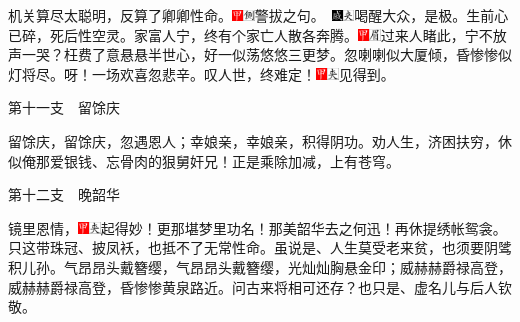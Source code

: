 机关算尽太聪明，反算了卿卿性命。{{\includegraphics[width=3mm]{../Images/00002}\includegraphics[width=3mm]{../Images/00011}\footnotesize \kaishu 警拔之句。　}\includegraphics[width=3mm]{../Images/00005}\includegraphics[width=3mm]{../Images/00012}\footnotesize \kaishu 喝醒大众，是极。}生前心已碎，死后性空灵。家富人宁，终有个家亡人散各奔腾。{\includegraphics[width=3mm]{../Images/00002}\includegraphics[width=3mm]{../Images/00010}\footnotesize \kaishu 过来人睹此，宁不放声一哭？}枉费了意悬悬半世心，好一似荡悠悠三更梦。忽喇喇似大厦倾，昏惨惨似灯将尽。呀！一场欢喜忽悲辛。叹人世，终难定！{\includegraphics[width=3mm]{../Images/00002}\includegraphics[width=3mm]{../Images/00012}\footnotesize \kaishu 见得到。}

第十一支　留馀庆

留馀庆，留馀庆，忽遇恩人；幸娘亲，幸娘亲，积得阴功。劝人生，济困扶穷，休似俺那爱银钱、忘骨肉的狠舅奸兄！正是乘除加减，上有苍穹。

第十二支　晚韶华

镜里恩情，{\includegraphics[width=3mm]{../Images/00002}\includegraphics[width=3mm]{../Images/00012}\footnotesize \kaishu 起得妙！}更那堪梦里功名！那美韶华去之何迅！再休提绣帐鸳衾。只这带珠冠、披凤袄，也抵不了无常性命。虽说是、人生莫受老来贫，也须要阴骘积儿孙。气昂昂头戴簪缨，气昂昂头戴簪缨，光灿灿胸悬金印；威赫赫爵禄高登，威赫赫爵禄高登，昏惨惨黄泉路近。问古来将相可还存？也只是、虚名儿与后人钦敬。

